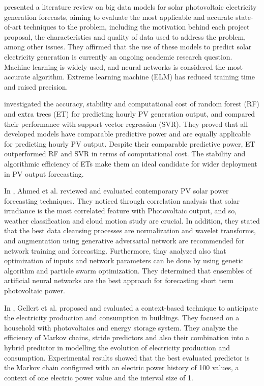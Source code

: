 \cite{DEFREITASVISCONDI201954} presented a literature review on big data models for solar photovoltaic electricity generation forecasts, aiming to evaluate the most applicable and accurate state-of-art techniques to the problem, including the motivation behind each project proposal, the characteristics and quality of data used to address the problem, among other issues.
They affirmed that the use of these models to predict solar electricity generation is currently an ongoing academic research question.
Machine learning is widely used, and neural networks is considered the most accurate algorithm.
Extreme learning machine (ELM) has reduced training time and raised precision.

\cite{AHMAD2018465} investigated the accuracy, stability and computational cost of random forest (RF) and extra trees (ET) for predicting hourly PV generation output, and compared their performance with support vector regression (SVR).
They proved that all developed models have comparable predictive power and are equally applicable for predicting hourly PV output.
Despite their comparable predictive power, ET outperformed RF and SVR in terms of computational cost.
The stability and algorithmic efficiency of ETs make them an ideal candidate for wider deployment in PV output forecasting.

In \cite{AHMED2020109792}, Ahmed et al. reviewed and evaluated contemporary PV solar power forecasting techniques.
They noticed through correlation analysis that solar irradiance is the most correlated feature with Photovoltaic output, and so, weather classification and cloud motion study are crucial.
In addition, they stated that the best data cleansing processes are normalization and wavelet transforms, and augmentation using generative adversarial network are recommended for network training and forecasting.
Furthermore, thay analyzed also that optimization of inputs and network parameters can be done by using genetic algorithm and particle swarm optimization.
They determined that ensembles of artificial neural networks are the best approach for forecasting short term photovoltaic power.

In \cite{GELLERT2019546}, Gellert et al. proposed and evaluated a context-based technique to anticipate the electricity production and consumption in buildings.
They focused on a household with photovoltaics and energy storage system.
They analyze the efficiency of Markov chains, stride predictors and also their combination into a hybrid predictor in modelling the evolution of electricity production and consumption.
Experimental results showed that the best evaluated predictor is the Markov chain configured with an electric power history of 100 values, a context of one electric power value and the interval size of 1.

